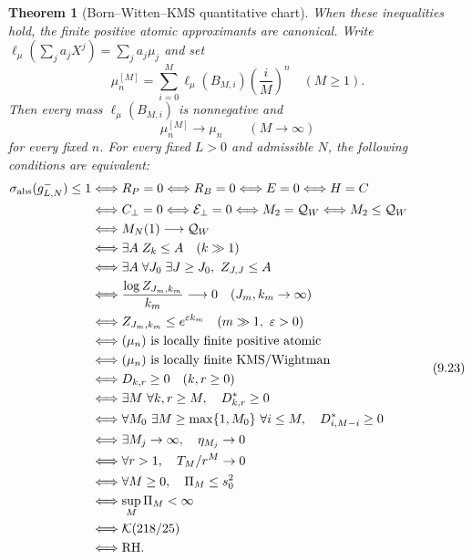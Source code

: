 \documentclass[11pt]{article}
\newtheorem{theorem}{Theorem}[section]
\begin{document}
\begin{theorem}[Born--Witten--KMS quantitative chart]
When these inequalities hold, the finite positive atomic approximants are canonical.  Write
$\ell_\mu(\sum_ja_jX^j)=\sum_ja_j\mu_j$ and set
\[
 \mu_n^{[M]}=
 \sum_{i=0}^{M}\ell_\mu(B_{M,i})\left(\frac{i}{M}\right)^n
 \quad(M\ge1).
 \tag{9.22hg}
\]
Then every mass $\ell_\mu(B_{M,i})$ is nonnegative and
\[
 \mu_n^{[M]}\longrightarrow\mu_n\qquad(M\to\infty)
 \tag{9.22hh}
\]
for every fixed $n$.
For every fixed $L>0$ and admissible $N$, the following conditions are equivalent:
\[
 \begin{aligned}
 \sigma_{\rm abs}(g_{L,N}^-)\le1
 &\Longleftrightarrow R_P=0
 \Longleftrightarrow R_B=0
 \Longleftrightarrow E=0
 \Longleftrightarrow H=C\\
 &\Longleftrightarrow C_\perp=0
 \Longleftrightarrow\mathcal E_\perp=0
 \Longleftrightarrow M_2=\mathcal Q_W
 \Longleftrightarrow M_2\le\mathcal Q_W\\
 &\Longleftrightarrow M_N(1)\longrightarrow\mathcal Q_W\\
 &\Longleftrightarrow \exists A\; Z_k\le A\quad(k\gg1)\\
 &\Longleftrightarrow \exists A\;\forall J_0\;\exists J\ge J_0,\ Z_{J,J}\le A\\
 &\Longleftrightarrow
 \frac{\log Z_{J_m,k_m}}{k_m}\longrightarrow0
 \quad(J_m,k_m\to\infty)\\
 &\Longleftrightarrow
 Z_{J_m,k_m}\le e^{\varepsilon k_m}
 \quad(m\gg1,\ \varepsilon>0)\\
 &\Longleftrightarrow(\mu_n)\text{ is locally finite positive atomic}\\
 &\Longleftrightarrow(\mu_n)\text{ is locally finite KMS/Wightman}\\
 &\Longleftrightarrow D_{k,r}\ge0\quad(k,r\ge0)\\
 &\Longleftrightarrow
 \exists M\ \forall k,r\ge M,\quad D^*_{k,r}\ge0\\
 &\Longleftrightarrow
 \forall M_0\ \exists M\ge\max\{1,M_0\}\ \forall i\le M,
       \quad D^*_{i,M-i}\ge0\\
 &\Longleftrightarrow
 \exists M_j\to\infty,\quad\eta_{M_j}\to0\\
 &\Longleftrightarrow
 \forall r>1,\quad T_M/r^M\to0\\
 &\Longleftrightarrow
 \forall M\ge0,\quad\Pi_M\le s_0^2\\
 &\Longleftrightarrow
 \sup_M\Pi_M<\infty\\
 &\Longleftrightarrow\mathcal K(218/25)\\
 &\Longleftrightarrow\mathrm{RH}.
 \end{aligned}
 \tag{9.23}
\]
\end{theorem}
\end{document}
